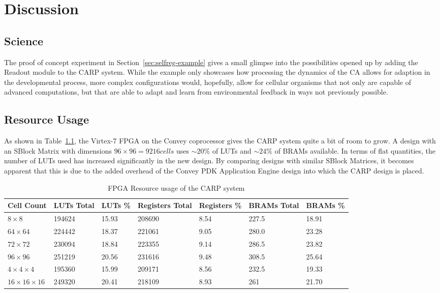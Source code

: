 \chapter{Discussion}

\section{Science}

The proof of concept experiment in Section~\ref{sec:selfreg-example} gives a
small glimpse into the possibilities opened up by adding the Readout module
to the CARP system. While the example only showcases how processing the dynamics
of the CA allows for adaption in the developmental process, more complex
configurations would, hopefully, allow for cellular organisms that not only are
capable of advanced computations, but that are able to adapt and learn from
environmental feedback in ways not previously possible.

\section{Resource Usage}


As shown in Table~\ref{tbl:resource-usage}, the Virtex-7 FPGA on the Convey
coprocessor gives the CARP system quite a bit of room to grow. A design with an
SBlock Matrix with dimensions $96\times96 = 9216 cells$ uses $\sim 20\%$ of LUTs
and $\sim 24\%$ of BRAMs available. In terms of flat quantities, the number
of LUTs used has increased significantly in the new design. By comparing designs
with similar SBlock Matrices, it becomes apparent that this is due to the added
overhead of the Convey PDK Application Engine design into which the CARP design
is placed.


\renewcommand{\arraystretch}{1.2}
\begin{table}[ht]
  \centering
  \begin{tabularx}{\linewidth}{X|X|X|X|X|X|X}
    Cell Count & LUTs Total & LUTs \% & Registers Total & Registers \% & BRAMs Total & BRAMs \%\\
    \hline
    $8\times8$ & 194624 & 15.93 & 208690 & 8.54 & 227.5 & 18.91\\ 
    \hline
    $64\times64$ & 224442 & 18.37 & 221061 & 9.05 & 280.0 & 23.28\\
    \hline
    $72\times72$ & 230094 & 18.84 & 223355 & 9.14 & 286.5 & 23.82\\
    \hline
    $96\times96$ & 251219 & 20.56 & 231616 & 9.48 & 308.5 & 25.64\\
    \hline
    $4\times4\times4$ & 195360 & 15.99 & 209171 & 8.56 & 232.5 & 19.33\\
    \hline
    $16\times16\times16$ & 249320 & 20.41 & 218109 & 8.93 & 261 & 21.70\\
  \end{tabularx}
  \caption{FPGA Resource usage of the CARP system}\label{tbl:resource-usage}
\end{table}

